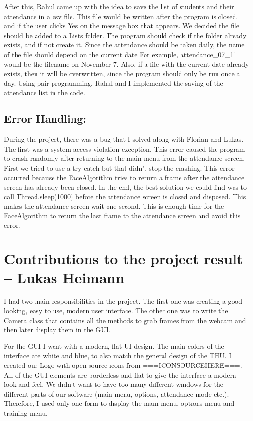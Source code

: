 \documentclass[12pt, a4paper]{article}
\begin{document}
After this, Rahul came up with the idea to save the list of students and their attendance in a csv file. This file would be written after the program is closed, and if the user clicks Yes on the message box that appears. We decided the file should be added to a Lists folder. The program should check if the folder already exists, and if not create it. Since the attendance should be taken daily, the name of the file should depend on the current date For example, attendance\_07\_11 would be the filename on November 7. Also, if a file with the current date already exists, then it will be overwritten, since the program should only be run once a day. Using pair programming, Rahul and I implemented the saving of the attendance list in the code.

\subsection{Error Handling:}
During the project, there was a bug that I solved along with Florian and Lukas. The first was a system access violation exception. This error caused the program to crash randomly after returning to the main menu from the attendance screen. First we tried to use a try-catch but that didn’t stop the crashing. This error occurred because the FaceAlgorithm tries to return a frame after the attendance screen has already been closed. In the end, the best solution we could find was to call Thread.sleep(1000) before the attendance screen is closed and disposed. This makes the attendance screen wait one second. This is enough time for the FaceAlgorithm to return the last frame to the attendance screen and avoid this error.

\newpage
\section{Contributions to the project result – Lukas Heimann}
I had two main responsibilities in the project. The first one was creating a good looking, easy to use, modern user interface. The other one was to write the Camera class that contains all the methods to grab frames from the webcam and then later display them in the GUI.

For the GUI I went with a modern, flat UI design. The main colors of the interface are white and blue, to also match the general design of the THU. I created our Logo with open source icons from ===ICONSOURCEHERE===. All of the GUI elements are borderless and flat to give the interface a modern look and feel. We didn’t want to have too many different windows for the different parts of our software (main menu, options, attendance mode etc.). Therefore, I used only one form to display the main menu, options menu and training menu.
\end{document}
